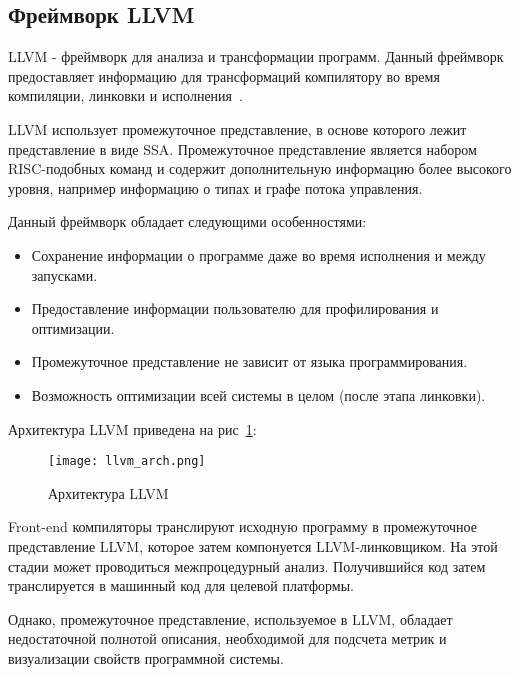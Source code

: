 \subsection{Фреймворк LLVM}


LLVM - фреймворк для анализа и трансформации программ. Данный фреймворк
предоставляет информацию для трансформаций компилятору во время компиляции,
линковки и исполнения~\cite{llvm}.

LLVM использует промежуточное представление, в основе которого лежит
представление в виде SSA. Промежуточное представление является набором
RISC-подобных команд и содержит дополнительную информацию более высокого уровня,
например информацию о типах и графе потока управления.

Данный фреймворк обладает следующими особенностями:

\begin{itemize}
    \item Сохранение информации о программе даже во время исполнения и между
    запусками.
    \item Предоставление информации пользователю для профилирования и
    оптимизации.
    \item Промежуточное представление не зависит от языка программирования.
    \item Возможность оптимизации всей системы в целом (после этапа линковки).
\end{itemize}

Архитектура LLVM приведена на рис~\ref{fig:llvm_arch}:

\begin{figure}[ht!]
    \begin{center}
        \texttt{[image: llvm\_arch.png]}
    \end{center}
    \caption{Архитектура LLVM}
    \label{fig:llvm_arch}
\end{figure}

Front-end компиляторы транслируют исходную программу в промежуточное
представление LLVM, которое затем компонуется LLVM-линковщиком. На этой стадии
может проводиться межпроцедурный анализ. Получившийся код затем транслируется
в машинный код для целевой платформы.

Однако, промежуточное представление, используемое в LLVM, обладает
недостаточной полнотой описания, необходимой для подсчета метрик и визуализации
свойств программной системы.

